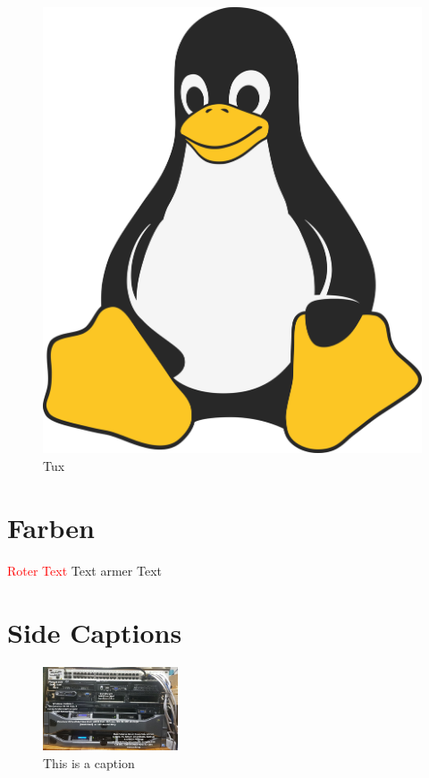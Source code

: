 \begin{figure}[h]
{\begin{minipage}{.42\linewidth}
            \includegraphics[width=\linewidth]{assets/icon.png}
            \caption{Tux}
            \label{fig:tux}
        \end{minipage}
    }
\end{figure}

\chapter{Farben}
\color{blue}
\lipsum[1-2]
\color{black}

\textcolor{red}{Roter Text} Text armer Text

\chapter{Side Captions}

\lipsum[1-2]
\begin{figure}[h]
    \caption{This is a caption}
    \includegraphics[width=4cm]{assets/2.jpg}
\end{figure}
\lipsum[1-2]


